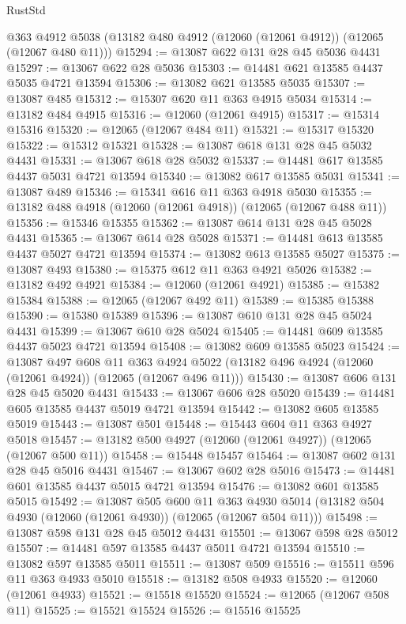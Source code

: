 \begin{lexlean}{RustStd}
\begin{coremodule}
    @363
    @4912
    @5038
    (@13182 @480 @4912 (@12060 (@12061 @4912)) (@12065 (@12067 @480 @11)))
@15294 := @13087 @622 @131 @28 @45 @5036 @4431
@15297 := @13067 @622 @28 @5036
@15303 := @14481 @621 @13585 @4437 @5035 @4721 @13594
@15306 := @13082 @621 @13585 @5035
@15307 := @13087 @485
@15312 := @15307 @620 @11 @363 @4915 @5034
@15314 := @13182 @484 @4915
@15316 := @12060 (@12061 @4915)
@15317 := @15314 @15316
@15320 := @12065 (@12067 @484 @11)
@15321 := @15317 @15320
@15322 := @15312 @15321
@15328 := @13087 @618 @131 @28 @45 @5032 @4431
@15331 := @13067 @618 @28 @5032
@15337 := @14481 @617 @13585 @4437 @5031 @4721 @13594
@15340 := @13082 @617 @13585 @5031
@15341 := @13087 @489
@15346 := @15341 @616 @11 @363 @4918 @5030
@15355 := @13182 @488 @4918 (@12060 (@12061 @4918)) (@12065 (@12067 @488 @11))
@15356 := @15346 @15355
@15362 := @13087 @614 @131 @28 @45 @5028 @4431
@15365 := @13067 @614 @28 @5028
@15371 := @14481 @613 @13585 @4437 @5027 @4721 @13594
@15374 := @13082 @613 @13585 @5027
@15375 := @13087 @493
@15380 := @15375 @612 @11 @363 @4921 @5026
@15382 := @13182 @492 @4921
@15384 := @12060 (@12061 @4921)
@15385 := @15382 @15384
@15388 := @12065 (@12067 @492 @11)
@15389 := @15385 @15388
@15390 := @15380 @15389
@15396 := @13087 @610 @131 @28 @45 @5024 @4431
@15399 := @13067 @610 @28 @5024
@15405 := @14481 @609 @13585 @4437 @5023 @4721 @13594
@15408 := @13082 @609 @13585 @5023
@15424 := @13087
    @497
    @608
    @11
    @363
    @4924
    @5022
    (@13182 @496 @4924 (@12060 (@12061 @4924)) (@12065 (@12067 @496 @11)))
@15430 := @13087 @606 @131 @28 @45 @5020 @4431
@15433 := @13067 @606 @28 @5020
@15439 := @14481 @605 @13585 @4437 @5019 @4721 @13594
@15442 := @13082 @605 @13585 @5019
@15443 := @13087 @501
@15448 := @15443 @604 @11 @363 @4927 @5018
@15457 := @13182 @500 @4927 (@12060 (@12061 @4927)) (@12065 (@12067 @500 @11))
@15458 := @15448 @15457
@15464 := @13087 @602 @131 @28 @45 @5016 @4431
@15467 := @13067 @602 @28 @5016
@15473 := @14481 @601 @13585 @4437 @5015 @4721 @13594
@15476 := @13082 @601 @13585 @5015
@15492 := @13087
    @505
    @600
    @11
    @363
    @4930
    @5014
    (@13182 @504 @4930 (@12060 (@12061 @4930)) (@12065 (@12067 @504 @11)))
@15498 := @13087 @598 @131 @28 @45 @5012 @4431
@15501 := @13067 @598 @28 @5012
@15507 := @14481 @597 @13585 @4437 @5011 @4721 @13594
@15510 := @13082 @597 @13585 @5011
@15511 := @13087 @509
@15516 := @15511 @596 @11 @363 @4933 @5010
@15518 := @13182 @508 @4933
@15520 := @12060 (@12061 @4933)
@15521 := @15518 @15520
@15524 := @12065 (@12067 @508 @11)
@15525 := @15521 @15524
@15526 := @15516 @15525

\end{coremodule}
\end{lexlean}
